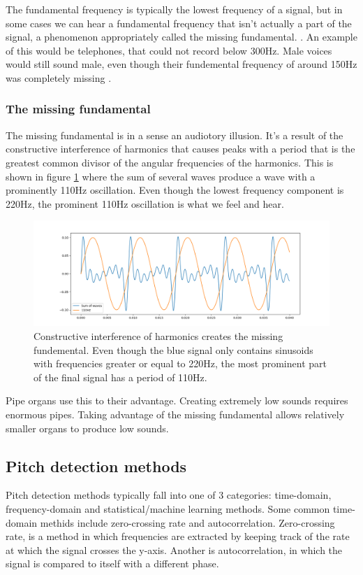 The fundamental frequency is typically the lowest frequency of a signal, but in some cases we can hear a fundamental frequency that isn't actually a part of the signal, a phenomenon appropriately called the missing fundamental. . An example of this would be telephones, that could not record below 300Hz. Male voices would still sound male, even though their fundemental frequency of around 150Hz was completely missing .

\subsubsection{The missing fundamental}
The missing fundamental is in a sense an audiotory illusion. It's a result of the constructive interference of harmonics that causes peaks with a period that is the greatest common divisor of the angular frequencies of the harmonics. This is shown in figure \ref{fig:missingfund} where the sum of several waves produce a wave with a prominently 110Hz oscillation. Even though the lowest frequency component is 220Hz, the prominent 110Hz oscillation is what we feel and hear.

\begin{figure}[ht]
    \centering
    \includegraphics[width=\textwidth]{./images/missingfund.png}
    \caption{Constructive interference of harmonics creates the missing fundemental. Even though the blue signal only contains sinusoids with frequencies greater or equal to 220Hz, the most prominent part of the final signal has a period of 110Hz. \label{fig:missingfund}}
\end{figure}

Pipe organs use this to their advantage. Creating extremely low sounds requires enormous pipes. Taking advantage of the missing fundamental allows relatively smaller organs to produce low sounds.

\subsection{Pitch detection methods}
Pitch detection methods typically fall into one of 3 categories: time-domain, frequency-domain and statistical/machine learning methods. Some common time-domain methids include zero-crossing rate and autocorrelation. Zero-crossing rate, is a method in which frequencies are extracted by keeping track of the rate at which the signal crosses the y-axis. Another is autocorrelation, in which the signal is compared to itself with a different phase. 

